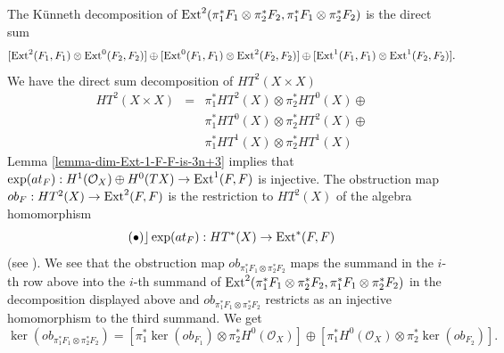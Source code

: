 \documentclass[12pt]{amsart}
\numberwithin{equation}{subsection}
\theoremstyle{plain}
\theoremstyle{definition}
\newcommand{\StructureSheaf}[1]{{\mathcal O}_{#1}}
\newcommand{\Ext}{{\rm Ext}}
\newcommand{\Contract}{\rfloor}
\begin{document}
The K\"{u}nneth  decomposition of $\Ext^2(\pi_1^*F_1\otimes \pi_2^*F_2,\pi_1^*F_1\otimes \pi_2^*F_2)$ is the direct  sum
\[
[\Ext^2(F_1,F_1)\otimes\Ext^0(F_2,F_2)]\oplus [\Ext^0(F_1,F_1)\otimes\Ext^2(F_2,F_2)]\oplus [\Ext^1(F_1,F_1)\otimes\Ext^1(F_2,F_2)].
\]
We have the direct sum decomposition of $HT^2(X\times X)$
\begin{eqnarray}
\label{eq-decomposition-of-HT-2}
HT^2(X\times X)&=& 
\pi_1^*HT^2(X)
\otimes\pi_2^*HT^0(X)\oplus
\\
\nonumber
&&
\pi_1^*HT^0(X)\otimes \pi_2^*HT^2(X)
\oplus
\\
\nonumber
& &
\pi_1^*HT^1(X)
\otimes \pi_2^*HT^1(X)
\end{eqnarray}
Lemma \ref{lemma-dim-Ext-1-F-F-is-3n+3} implies that $\exp(at_F): H^1(\StructureSheaf{X})\oplus H^0(TX)\rightarrow \Ext^1(F,F)$ is injective. 
The obstruction map $ob_F:HT^2(X)\rightarrow \Ext^2(F,F)$ is the restriction to $HT^2(X)$ of the algebra homomorphism 
\[
(\bullet)\Contract \exp(at_F):HT^*(X)\rightarrow \Ext^*(F,F)
\]
(see \cite[Theorem A]{Huang}).
We see that the obstruction map $ob_{\pi_1^*F_1\otimes\pi_2^*F_2}$ maps the  summand in the $i$-th row above into the $i$-th summand of $\Ext^2(\pi_1^*F_1\otimes \pi_2^*F_2,\pi_1^*F_1\otimes \pi_2^*F_2)$ in the decomposition displayed above and 
$ob_{\pi_1^*F_1\otimes\pi_2^*F_2}$ restricts  as an injective homomorphism to the third summand. We get
\begin{equation}
\label{eq-kernel-of-obstruction-of-box-product}
\ker(ob_{\pi_1^*F_1\otimes\pi_2^*F_2})=[\pi_1^*\ker(ob_{F_1})\otimes \pi_2^*H^0(\StructureSheaf{X})]
\oplus [\pi_1^*H^0(\StructureSheaf{X})\otimes\pi_2^*\ker(ob_{F_2})].
\end{equation}
\end{document}
